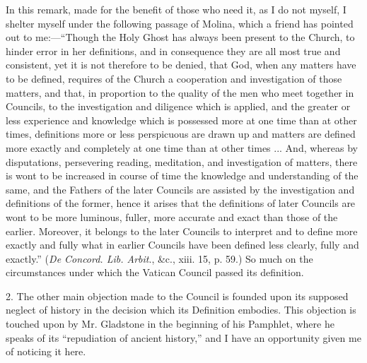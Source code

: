 In this remark, made for the benefit of those who need it, as I do
not myself, I shelter myself under the following passage of Molina,
which a friend has pointed out to me:—``Though the Holy Ghost has
always been present to the Church, to hinder error in her definitions,
and in consequence they are all most true and consistent, yet it is not
therefore to be denied, that God, when any matters have to be defined,
requires of the Church a cooperation and investigation of those matters,
and that, in proportion to the quality of the men who meet together in
Councils, to the investigation and diligence which is applied, and the
greater or less experience and knowledge which is possessed more at one
time than at other times, definitions more or less perspicuous are drawn
up and matters are defined more exactly and completely at one time
than at other times ... And, whereas by disputations, persevering
reading, meditation, and investigation of matters, there is wont to be
increased in course of time the knowledge and understanding of the same,
and the Fathers of the later Councils are assisted by the investigation
and definitions of the former, hence it arises that the definitions of
later Councils are wont to be more luminous, fuller, more accurate and
exact than those of the earlier. Moreover, it belongs to the later
Councils to interpret and to define more exactly and fully what in
earlier Councils have been defined less clearly, fully and
exactly.'' (\emph{De Concord. Lib. Arbit}., \&c., xiii. 15, p.
59.) So much on the circumstances under which the Vatican Council passed
its definition.

2. The other main objection made to the Council is founded upon its
supposed neglect of history in the decision which its Definition
embodies. This objection is touched upon by Mr. Gladstone in the
beginning of his Pamphlet, where he speaks of its ``repudiation of
ancient history,'' and I have an opportunity given me of noticing it
here.

